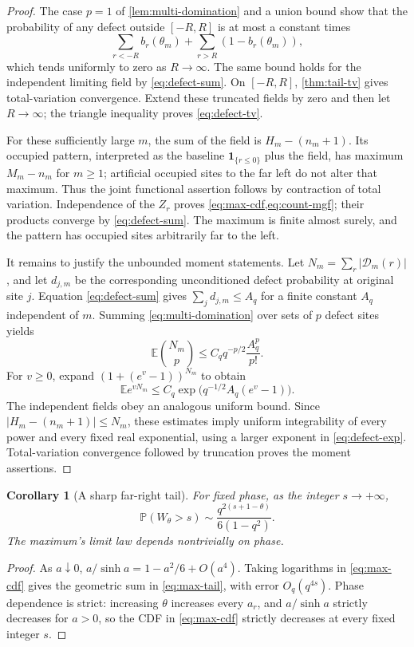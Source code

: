 \documentclass[11pt,a4paper]{article}
\numberwithin{equation}{section}
\newtheorem{corollary}[theorem]{Corollary}
\theoremstyle{definition}
\theoremstyle{remark}
\newcommand{\E}{\mathbb E}
\newcommand{\PP}{\mathbb P}
\newcommand{\ind}{\mathbf 1}
\begin{document}
\begin{proof}
The case $p=1$ of \cref{lem:multi-domination} and a union bound show
that the probability of any defect outside $[-R,R]$ is at most a constant
times
\[
\sum_{r<-R}b_r(\theta_m)+\sum_{r>R}(1-b_r(\theta_m)),
\]
which tends uniformly to zero as $R\to\infty$. The same bound holds
for the independent limiting field by \cref{eq:defect-sum}.
On $[-R,R]$, \cref{thm:tail-tv} gives total-variation convergence.
Extend these truncated fields by zero and then let $R\to\infty$;
the triangle inequality proves \cref{eq:defect-tv}.

For these sufficiently large $m$, the sum of the field is $H_m-(n_m+1)$. Its occupied pattern, interpreted
as the baseline $\ind_{\{r\le0\}}$ plus the field, has maximum
$M_m-n_m$ for $m\ge1$; artificial occupied sites to the far left do not
alter that maximum. Thus the joint functional assertion follows by
contraction of total variation. Independence of the $Z_r$ proves
\cref{eq:max-cdf,eq:count-mgf}; their products converge by
\cref{eq:defect-sum}. The maximum is finite almost surely, and the
pattern has occupied sites arbitrarily far to the left.

It remains to justify the unbounded moment statements. Let
$N_m=\sum_r|\mathcal D_m(r)|$, and let $d_{j,m}$ be the corresponding
unconditioned defect probability at original site $j$. Equation
\cref{eq:defect-sum} gives $\sum_jd_{j,m}\le A_q$ for a finite
constant $A_q$ independent of $m$. Summing
\cref{eq:multi-domination} over sets of $p$ defect sites yields
\[
\E\binom{N_m}{p}
\le C_q q^{-p/2}\frac{A_q^p}{p!}.
\]
For $v\ge0$, expand $(1+(e^v-1))^{N_m}$ to obtain
\begin{equation}
\E e^{vN_m}\le C_q
 \exp\bigl(q^{-1/2}A_q(e^v-1)\bigr).
\label{eq:defect-exp}
\end{equation}
The independent fields obey an analogous uniform bound. Since
$|H_m-(n_m+1)|\le N_m$, these estimates imply uniform integrability
of every power and every fixed real exponential, using a larger
exponent in \cref{eq:defect-exp}. Total-variation convergence followed
by truncation proves the moment assertions.
\end{proof}

\begin{corollary}[A sharp far-right tail]
\label{cor:max-tail}
For fixed phase, as the integer $s\to+\infty$,
\begin{equation}
\PP(W_\theta>s)
\sim\frac{q^{2(s+1-\theta)}}{6(1-q^2)}.
\label{eq:max-tail}
\end{equation}
The maximum's limit law depends nontrivially on phase.
\end{corollary}
\begin{proof}
As $a\downarrow0$, $a/\sinh a=1-a^2/6+O(a^4)$.
Taking logarithms in \cref{eq:max-cdf} gives the geometric sum in
\cref{eq:max-tail}, with error $O_q(q^{4s})$. Phase dependence is
strict: increasing $\theta$ increases every $a_r$, and $a/\sinh a$
strictly decreases for $a>0$, so the CDF in \cref{eq:max-cdf} strictly
decreases at every fixed integer $s$.
\end{proof}
\end{document}
